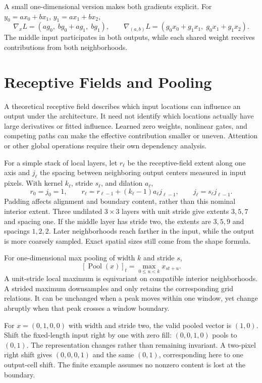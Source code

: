 A small one-dimensional version makes both gradients explicit. For $y_0=ax_0+bx_1$, $y_1=ax_1+bx_2$,
\[
\nabla_xL=(ag_0,\;bg_0+ag_1,\;bg_1),\qquad
\nabla_{(a,b)}L=(g_0x_0+g_1x_1,\;g_0x_1+g_1x_2).
\]
The middle input participates in both outputs, while each shared weight receives contributions from both neighborhoods.

\section{Receptive Fields and Pooling}

A theoretical receptive field describes which input locations can influence an output under the architecture. It need not identify which locations actually have large derivatives or fitted influence. Learned zero weights, nonlinear gates, and competing paths can make the effective contribution smaller or uneven. Attention or other global operations require their own dependency analysis.

For a simple stack of local layers, let $r_\ell$ be the receptive-field extent along one axis and $j_\ell$ the spacing between neighboring output centers measured in input pixels. With kernel $k_\ell$, stride $s_\ell$, and dilation $a_\ell$,
\[
r_0=j_0=1,\qquad
r_\ell=r_{\ell-1}+(k_\ell-1)a_\ell j_{\ell-1},\qquad
j_\ell=s_\ell j_{\ell-1}.
\]
Padding affects alignment and boundary content, rather than this nominal interior extent. Three undilated $3\times3$ layers with unit stride give extents $3,5,7$ and spacing one. If the middle layer has stride two, the extents are $3,5,9$ and spacings $1,2,2$. Later neighborhoods reach farther in the input, while the output is more coarsely sampled. Exact spatial sizes still come from the shape formula.

For one-dimensional max pooling of width $k$ and stride $s$,
\[
[\operatorname{Pool}(x)]_t=\max_{0\le u<k}x_{st+u}.
\]
A unit-stride local maximum is equivariant on compatible interior neighborhoods. A strided maximum downsamples and only retains the corresponding grid relations. It can be unchanged when a peak moves within one window, yet change abruptly when that peak crosses a window boundary.

For $x=(0,1,0,0)$ with width and stride two, the valid pooled vector is $(1,0)$. Shift the fixed-length input right by one with zero fill: $(0,0,1,0)$ pools to $(0,1)$. The representation changes rather than remaining invariant. A two-pixel right shift gives $(0,0,0,1)$ and the same $(0,1)$, corresponding here to one output-cell shift. The finite example assumes no nonzero content is lost at the boundary.

